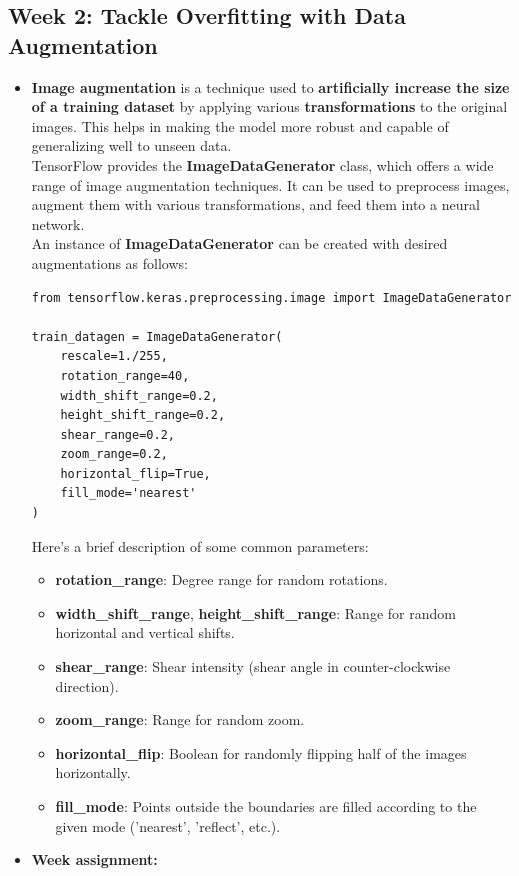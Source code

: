 \documentclass[20pt]{article}
\begin{document}
	\subsection{Week 2: Tackle Overfitting with Data Augmentation}
	\begin{itemize}
		\item \textbf{Image augmentation} is a technique used to \textbf{artificially increase the size of a training dataset} by applying various \textbf{transformations} to the original images. This helps in making the model more robust and capable of generalizing well to unseen data.\\
		TensorFlow provides the \textbf{ImageDataGenerator} class, which offers a wide range of image augmentation techniques. It can be used to preprocess images, augment them with various transformations, and feed them into a neural network.\\
		An instance of \textbf{ImageDataGenerator} can be created with desired augmentations as follows:
		\begin{verbatim}
from tensorflow.keras.preprocessing.image import ImageDataGenerator

train_datagen = ImageDataGenerator(
	rescale=1./255,
	rotation_range=40,
	width_shift_range=0.2,
	height_shift_range=0.2,
	shear_range=0.2,
	zoom_range=0.2,
	horizontal_flip=True,
	fill_mode='nearest'
)
		\end{verbatim}
		Here's a brief description of some common parameters:
		\begin{itemize}
			\item \textbf{rotation\_range}: Degree range for random rotations.
			\item \textbf{width\_shift\_range}, \textbf{height\_shift\_range}: Range for random horizontal and vertical shifts.
			\item \textbf{shear\_range}: Shear intensity (shear angle in counter-clockwise direction).
			\item \textbf{zoom\_range}: Range for random zoom.
			\item \textbf{horizontal\_flip}: Boolean for randomly flipping half of the images horizontally.
			\item \textbf{fill\_mode}: Points outside the boundaries are filled according to the given mode ('nearest', 'reflect', etc.).
		\end{itemize}
		\item \textbf{Week assignment:}
		
	\end{itemize}
\end{document}
